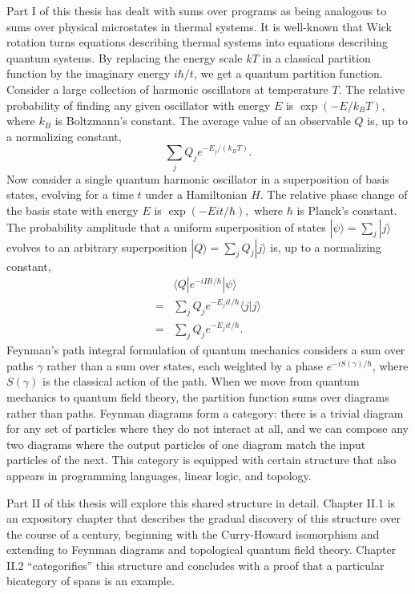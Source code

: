 \documentclass[12pt,twoside,openright]{report}
\begin{document}
Part I of this thesis has dealt with sums over programs as being analogous to sums over physical microstates in thermal systems.  It is well-known that Wick rotation turns equations describing thermal systems into equations describing quantum systems.  By replacing the energy scale $kT$ in a classical partition function by the imaginary energy $i\hbar/t$, we get a quantum partition function.  Consider a large collection of harmonic oscillators at temperature $T$.  The relative probability of finding any given oscillator with energy $E$ is $\exp(-E/k_B T)$, where $k_B$ is Boltzmann's constant. The average value of an observable $Q$ is, up to a normalizing constant,
\[ \sum_j Q_j e^{-E_j / (k_B T)}.\]
Now consider a single quantum harmonic oscillator in a superposition of basis states, evolving for a time $t$ under a Hamiltonian $H$. The relative phase change of the basis state with energy $E$ is $\exp(-E it/ \hbar),$ where $\hbar$ is Planck's constant. The probability amplitude that a uniform superposition of states $|\psi\rangle = \sum_j |j\rangle$ evolves to an arbitrary superposition $|Q\rangle = \sum_j Q_j |j\rangle$ is, up to a normalizing constant,
\begin{align*}
   & \langle Q|e^{-iHt/\hbar}|\psi\rangle \\
  = & \sum_j Q_j e^{-E_j it/ \hbar}\langle j|j\rangle \\
  = & \sum_j Q_j e^{-E_j it/ \hbar}.
\end{align*}
Feynman's path integral formulation of quantum mechanics considers a sum over paths $\gamma$ rather than a sum over states, each weighted by a phase $e^{-iS(\gamma)/\hbar}$, where $S(\gamma)$ is the classical action of the path.  When we move from quantum mechanics to quantum field theory, the partition function sums over diagrams rather than paths.  Feynman diagrams form a category: there is a trivial diagram for any set of particles where they do not interact at all, and we can compose any two diagrams where the output particles of one diagram match the input particles of the next.  This category is equipped with certain structure that also appears in programming languages, linear logic, and topology.

Part II of this thesis will explore this shared structure in detail.  Chapter II.1 is an expository chapter that describes the gradual discovery of this structure over the course of a century, beginning with the Curry-Howard isomorphism and extending to Feynman diagrams and topological quantum field theory.  Chapter II.2 ``categorifies'' this structure and concludes with a proof that a particular bicategory of spans is an example.
\end{document}
